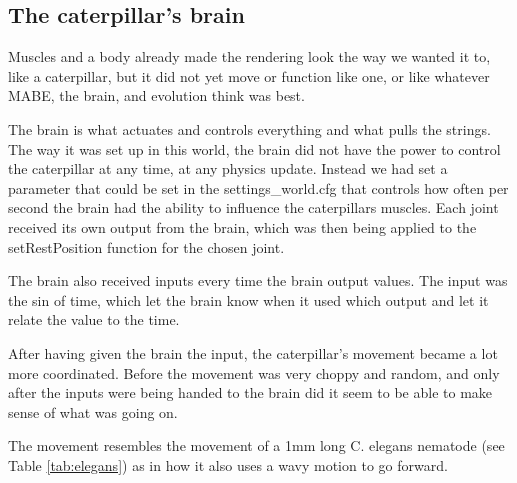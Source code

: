 \documentclass[12pt,oneside,listof=totoc,paper=a4,headings=small]{scrbook}
\begin{document}
\subsection{The caterpillar's brain}
Muscles and a body already made the rendering look the way we wanted it to, like a  caterpillar, but it did not yet move or function like one, or like whatever MABE, the brain, and evolution think was best. 

The brain is what actuates and controls everything and what pulls the strings.
The way it was set up in this world, the brain did not have the power to control the caterpillar at any time, at any physics update. Instead we had set a parameter that could be set in the settings\_world.cfg that controls how often per second the brain had the ability to influence the caterpillars muscles. 
Each joint received its own output from the brain, which was then being applied to the setRestPosition function for the chosen joint. 

The brain also received inputs every time the brain output values. The input was the sin of time, which let the brain know when it used which output and let it relate the value to the time.

After having given the brain the input, the caterpillar's movement became a lot more coordinated. Before the movement was very choppy and random, and only after the inputs were being handed to the brain did it seem to be able to make sense of what was going on. 

The movement resembles the movement of a 1mm long C. elegans nematode (see Table \ref{tab:elegans}) as in how it also uses a wavy motion to go forward.
\end{document}
